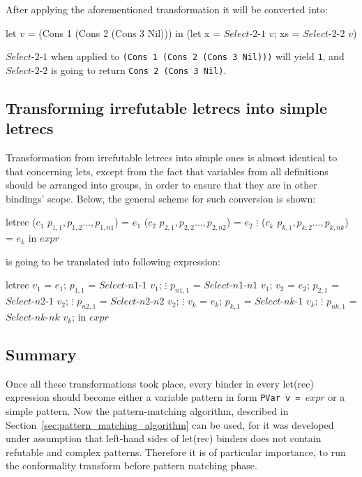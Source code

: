 \documentclass[12pt,a4paper]{report}
\begin{document}
After applying the aforementioned transformation it will be converted into:

\vspace*{0.2in}
\begin{code}[style=haskell,mathescape=true]
  let $v$ = (Cons 1 (Cons 2 (Cons 3 Nil)))
  in (let x  = $Select\mbox{-}2\mbox{-}1$ $v$;
          xs = $Select\mbox{-}2\mbox{-}2$ $v$)
\end{code}

$Select\mbox{-}2\mbox{-}1$ when applied to \texttt{(Cons 1 (Cons 2 (Cons 3
Nil)))} will yield \texttt{1}, and $Select\mbox{-}2\mbox{-}2$ is going to return
\texttt{Cons 2 (Cons 3 Nil)}.

\subsection{Transforming irrefutable letrecs into simple letrecs}
Transformation from irrefutable letrecs into simple ones is almost identical to
that concerning lets, except from the fact that variables from all definitions
should be arranged into groups, in order to ensure that they are in other
bindings' scope. Below, the general scheme for such conversion is shown:

\vspace*{0.2in}
\begin{code}[style=haskell,mathescape=true]
  letrec ($c_1$ $p_{1,1}, p_{1,2} \ldots, p_{1,n1}$) = $e_1$
         ($c_2$ $p_{2,1}, p_{2,2} \ldots, p_{2,n2}$) = $e_2$
                  $\vdots$
         ($c_k$ $p_{k,1}, p_{k,2} \ldots, p_{k,nk}$) = $e_k$
  in $expr$
\end{code}

is going to be translated into following expression:

\vspace*{0.2in}
\begin{code}[style=haskell,mathescape=true]
  letrec
      $v_1$ = $e_1$;
      $p_{1,1}$ = $Select\mbox{-}n1\mbox{-}1$ $v_1$;
                $\vdots$
      $p_{n1,1}$ = $Select\mbox{-}n1\mbox{-}n1$ $v_1$;
      $v_2$ = $e_2$;
      $p_{2,1}$ = $Select\mbox{-}n2\mbox{-}1$ $v_2$;
                $\vdots$
      $p_{n2,1}$ = $Select\mbox{-}n2\mbox{-}n2$ $v_2$;
                $\vdots$
      $v_k$ = $e_k$;
      $p_{k,1}$ = $Select\mbox{-}nk\mbox{-}1$ $v_k$;
                $\vdots$
      $p_{nk,1}$ = $Select\mbox{-}nk\mbox{-}nk$ $v_k$;
  in $expr$
\end{code}

\subsection{Summary}
Once all these transformations took place, every binder in every let(rec)
expression should become either a variable pattern in form \texttt{PVar v =
$expr$} or a simple pattern. Now the pattern-matching algorithm, described in
Section~\ref{sec:pattern_matching_algorithm} can be used, for it was developed
under assumption that left-hand sides of let(rec) binders does not contain
refutable and complex patterns. Therefore it is of particular importance, to
run the conformality transform before pattern matching phase.
\end{document}
